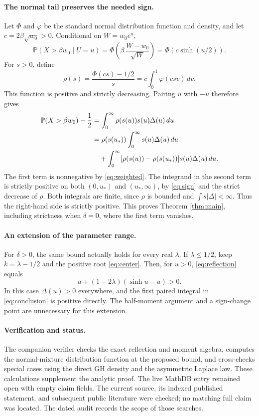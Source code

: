 \documentclass[11pt]{article}
\newcommand{\Prob}{\mathbb P}
\begin{document}
\paragraph{The normal tail preserves the needed sign.}
Let \(\Phi\) and \(\varphi\) be the standard normal distribution function
and density, and let \(c=2\beta\sqrt{w_0}>0\).
Conditional on \(W=w_0e^u\),
\[
 \Prob(X>\beta w_0\mid U=u)
 =\Phi\left(\beta\,\frac{W-w_0}{\sqrt W}\right)
 =\Phi(c\sinh(u/2)).
\]
For \(s>0\), define
\[
 \rho(s)=\frac{\Phi(cs)-1/2}{s}
        =c\int_0^1\varphi(csv)\,dv.
\]
This function is positive and strictly decreasing. Pairing \(u\) with
\(-u\) therefore gives
\begin{align}
 \Prob(X>\beta w_0)-\frac12
 &=\int_0^\infty \rho(s(u))s(u)\Delta(u)\,du \notag\\
 &=\rho(s(u_*))\int_0^\infty s(u)\Delta(u)\,du \notag\\
 &\quad+\int_0^\infty
       [\rho(s(u))-\rho(s(u_*))]s(u)\Delta(u)\,du.            \label{eq:conclusion}
\end{align}
The first term is nonnegative by \eqref{eq:weighted}.
The integrand in the second term is strictly positive on both
\((0,u_*)\) and \((u_*,\infty)\), by \eqref{eq:sign} and the strict
decrease of \(\rho\). Both integrals are finite, since \(\rho\) is bounded
and \(\int s|\Delta|<\infty\).
Thus the right-hand side is strictly positive. This proves
Theorem \ref{thm:main}, including strictness when \(\delta=0\), where
the first term vanishes.

\paragraph{An extension of the parameter range.}
For \(\delta>0\), the same bound actually holds for every real \(\lambda\).
If \(\lambda\leq1/2\), keep \(k=\lambda-1/2\) and the positive root
\eqref{eq:center}. Then, for \(u>0\), \eqref{eq:reflection} equals
\[
 u+(1-2\lambda)(\sinh u-u)>0.
\]
In this case \(\Delta(u)>0\) everywhere, and the first paired integral
in \eqref{eq:conclusion} is positive directly. The half-moment argument
and a sign-change point are unnecessary for this extension.

\paragraph{Verification and status.}
The companion verifier checks the exact reflection and moment algebra,
computes the normal-mixture distribution function at the proposed bound,
and cross-checks special cases using the direct GH density and the
asymmetric Laplace law. These calculations supplement the analytic proof.
The live MathDB entry remained open with empty claim fields.
The current source, its indexed published statement, and subsequent
public literature were checked; no matching full claim was located.
The dated audit records the scope of those searches.
\end{document}

